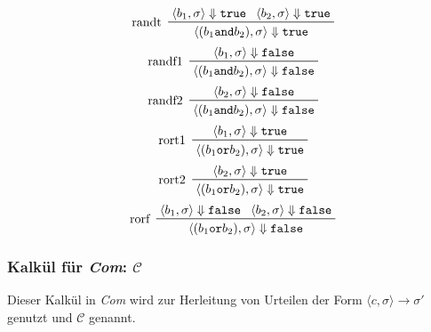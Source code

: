 \begin{multicols}{2}
\begin{equation*}
					\end{equation*}
					\begin{equation*}
						\prftree[l]
						{ randt }
						{ \langle b _ 1, \sigma \rangle \Downarrow \texttt{true} }
						{ \langle b _ 2, \sigma \rangle \Downarrow \texttt{true} }
						{ \langle (b _ 1 \texttt{and} b _ 2), \sigma \rangle \Downarrow \texttt{true} }
					\end{equation*}
					\begin{equation*}
						\prftree[l]
						{ randf1 }
						{ \langle b _ 1, \sigma \rangle \Downarrow \texttt{false} }
						{ \langle (b _ 1 \texttt{and} b _ 2), \sigma \rangle \Downarrow \texttt{false} }
					\end{equation*}
					\begin{equation*}
						\prftree[l]
						{ randf2 }
						{ \langle b _ 2, \sigma \rangle \Downarrow \texttt{false} }
						{ \langle (b _ 1 \texttt{and} b _ 2), \sigma \rangle \Downarrow \texttt{false} }
					\end{equation*}
					\begin{equation*}
						\prftree[l]
						{ rort1 }
						{ \langle b _ 1, \sigma \rangle \Downarrow \texttt{true} }
						{ \langle (b _ 1 \texttt{or} b _ 2), \sigma \rangle \Downarrow \texttt{true} }
					\end{equation*}
					\begin{equation*}
						\prftree[l]
						{ rort2 }
						{ \langle b _ 2, \sigma \rangle \Downarrow \texttt{true} }
						{ \langle (b _ 1 \texttt{or} b _ 2), \sigma \rangle \Downarrow \texttt{true} }
					\end{equation*}
					\begin{equation*}
						\prftree[l]
						{ rorf }
						{ \langle b _ 1, \sigma \rangle \Downarrow \texttt{false} }
						{ \langle b _ 2, \sigma \rangle \Downarrow \texttt{false} }
						{ \langle (b _ 1 \texttt{or} b _ 2), \sigma \rangle \Downarrow \texttt{false} }
					\end{equation*}
				\end{multicols}

			\subsubsection{Kalkül für \textit{Com}: $ \mathcal{C} $}
				Dieser Kalkül in \textit{Com} wird zur Herleitung von Urteilen der Form $ \langle c, \sigma \rangle \rightarrow \sigma' $ genutzt und $ \mathcal{C} $ genannt.

